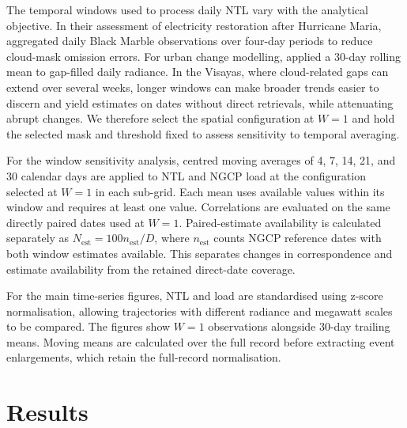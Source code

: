 \documentclass[]{interact}
\theoremstyle{plain}%
\theoremstyle{definition}
\theoremstyle{remark}
\begin{document}
        The temporal windows used to process daily NTL vary with the analytical objective. In their assessment of electricity restoration after Hurricane Maria, \citet{Roman2019_PLOSone_Maria} aggregated daily Black Marble observations over four-day periods to reduce cloud-mask omission errors. For urban change modelling, \citet{Chakraborty2023_RSE_AdaptiveModeling} applied a 30-day rolling mean to gap-filled daily radiance. In the Visayas, where cloud-related gaps can extend over several weeks, longer windows can make broader trends easier to discern and yield estimates on dates without direct retrievals, while attenuating abrupt changes. We therefore select the spatial configuration at $W=1$ and hold the selected mask and threshold fixed to assess sensitivity to temporal averaging.
        
        For the window sensitivity analysis, centred moving averages of 4, 7, 14, 21, and 30 calendar days are applied to NTL and NGCP load at the configuration selected at $W=1$ in each sub-grid. Each mean uses available values within its window and requires at least one value. Correlations are evaluated on the same directly paired dates used at $W=1$. Paired-estimate availability is calculated separately as $N_{\mathrm{est}}=100n_{\mathrm{est}}/D$, where $n_{\mathrm{est}}$ counts NGCP reference dates with both window estimates available. This separates changes in correspondence and estimate availability from the retained direct-date coverage.
        
        For the main time-series figures, NTL and load are standardised using z-score normalisation, allowing trajectories with different radiance and megawatt scales to be compared. The figures show $W=1$ observations alongside 30-day trailing means. Moving means are calculated over the full record before extracting event enlargements, which retain the full-record normalisation.
                
\section{Results}
    
\end{document}
